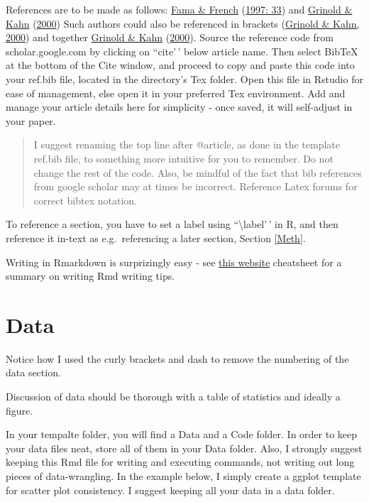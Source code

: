 \documentclass[11pt,preprint, authoryear]{elsarticle}
\numberwithin{equation}{section}
\numberwithin{figure}{section}
\numberwithin{table}{section}
\begin{document}
References are to be made as follows:
\protect\hyperlink{ref-fama1997}{Fama \& French}
(\protect\hyperlink{ref-fama1997}{1997: 33}) and
\protect\hyperlink{ref-grinold2000}{Grinold \& Kahn}
(\protect\hyperlink{ref-grinold2000}{2000}) Such authors could also be
referenced in brackets (\protect\hyperlink{ref-grinold2000}{Grinold \&
Kahn, 2000}) and together \protect\hyperlink{ref-grinold2000}{Grinold \&
Kahn} (\protect\hyperlink{ref-grinold2000}{2000}). Source the reference
code from scholar.google.com by clicking on ``cite'\,' below article
name. Then select BibTeX at the bottom of the Cite window, and proceed
to copy and paste this code into your ref.bib file, located in the
directory's Tex folder. Open this file in Rstudio for ease of
management, else open it in your preferred Tex environment. Add and
manage your article details here for simplicity - once saved, it will
self-adjust in your paper.

\begin{quote}
I suggest renaming the top line after @article, as done in the template
ref.bib file, to something more intuitive for you to remember. Do not
change the rest of the code. Also, be mindful of the fact that bib
references from google scholar may at times be incorrect. Reference
Latex forums for correct bibtex notation.
\end{quote}

To reference a section, you have to set a label using
``\textbackslash label'\,' in R, and then reference it in-text as
e.g.~referencing a later section, Section \ref{Meth}.

Writing in Rmarkdown is surprizingly easy - see
\href{https://www.rstudio.com/wp-content/uploads/2015/03/rmarkdown-reference.pdf}{this
website} cheatsheet for a summary on writing Rmd writing tips.

\hypertarget{data}{%
\section*{Data}\label{data}}

Notice how I used the curly brackets and dash to remove the numbering of
the data section.

Discussion of data should be thorough with a table of statistics and
ideally a figure.

In your tempalte folder, you will find a Data and a Code folder. In
order to keep your data files neat, store all of them in your Data
folder. Also, I strongly suggest keeping this Rmd file for writing and
executing commands, not writing out long pieces of data-wrangling. In
the example below, I simply create a ggplot template for scatter plot
consistency. I suggest keeping all your data in a data folder.
\end{document}
